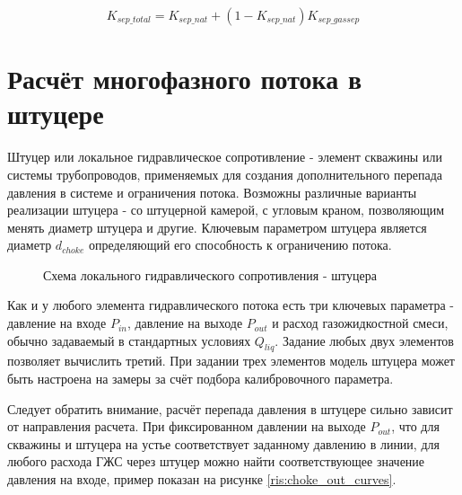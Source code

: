 $$K_{sep\_total} = K_{sep\_nat} + (1-K_{sep\_nat}) K_{sep\_gassep}$$


\section{Расчёт многофазного потока в штуцере}


Штуцер или локальное гидравлическое сопротивление - элемент скважины или системы трубопроводов, применяемых для создания дополнительного перепада давления в системе и ограничения потока. 
Возможны различные варианты реализации штуцера - со штуцерной камерой, с угловым краном, позволяющим менять диаметр штуцера и другие.
Ключевым параметром штуцера является диаметр \(d_{choke} \) определяющий его способность к ограничению потока. 

\begin{figure}[h!]
	\begin{center}
	    
		\caption{Схема локального гидравлического сопротивления - штуцера}
		\label{ris:Pipe_choke}
	\end{center}
\end{figure}

Как и у любого элемента гидравлического потока есть три ключевых параметра - давление на входе \( P_{in} \), давление на выходе \(P_{out}\)  и расход газожидкостной смеси, обычно задаваемый в стандартных условиях \(Q_{liq} \). Задание любых двух элементов позволяет вычислить третий. При задании трех элементов модель штуцера может быть настроена на замеры за счёт подбора калибровочного параметра.

Следует обратить внимание, расчёт перепада давления в штуцере сильно зависит от направления расчета. При фиксированном давлении на выходе $P_{out}$, что для скважины и штуцера на устье соответствует заданному давлению в линии, для любого расхода ГЖС через штуцер можно найти соответствующее значение давления на входе, пример показан на рисунке \ref{ris:choke_out_curves}.
 

